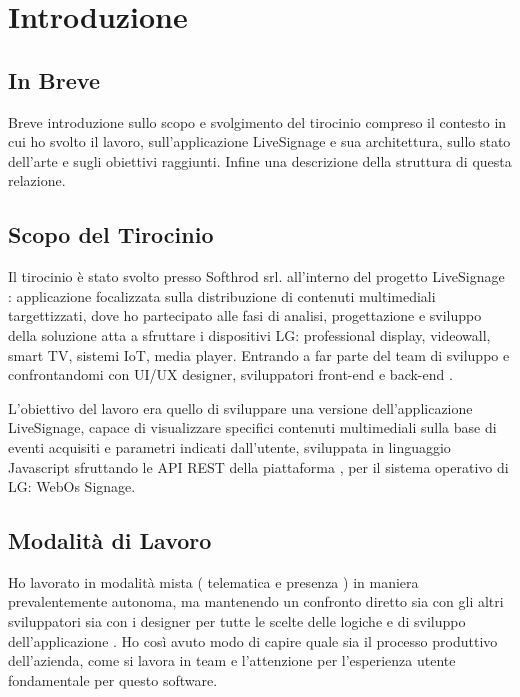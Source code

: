 \chapter{Introduzione}
\linespread{1.5}

\section{In Breve}
Breve introduzione sullo scopo e svolgimento del tirocinio compreso il contesto in cui ho svolto il lavoro, sull'applicazione LiveSignage e sua architettura, sullo stato dell'arte e sugli obiettivi raggiunti. Infine una descrizione della struttura di questa relazione. 

\section{Scopo del Tirocinio}

Il tirocinio è stato svolto presso  Softhrod srl.  all'interno del progetto LiveSignage : applicazione focalizzata sulla distribuzione di contenuti multimediali targettizzati, dove ho partecipato alle fasi di analisi, progettazione e sviluppo della soluzione atta a sfruttare  i dispositivi LG: professional display, videowall, smart TV, sistemi IoT, media player. Entrando a far parte del team di sviluppo e confrontandomi con UI/UX designer, sviluppatori front-end e back-end .

L'obiettivo del lavoro era quello di sviluppare una versione dell'applicazione LiveSignage, capace  di visualizzare specifici contenuti multimediali sulla base di eventi acquisiti  e parametri indicati dall'utente, sviluppata in linguaggio Javascript sfruttando le API REST della piattaforma , per il sistema operativo di LG: WebOs Signage.

\section{Modalità di Lavoro}

Ho lavorato in modalità mista ( telematica e presenza ) in maniera prevalentemente autonoma, ma mantenendo un confronto diretto sia con gli altri sviluppatori sia con i designer per tutte le scelte delle logiche e di sviluppo dell'applicazione . Ho così avuto modo di capire quale sia il processo produttivo dell'azienda, come si lavora in team e l'attenzione per l'esperienza utente fondamentale per questo software.

